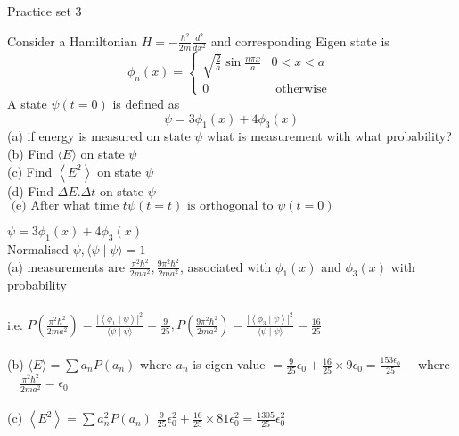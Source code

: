 \newpage
\begin{abox}
	Practice set 3
	\end{abox}
\begin{enumerate}
	\begin{minipage}{\textwidth}
	\item Consider a Hamiltonian $H=-\frac{\hbar^{2}}{2 m} \frac{d^{2}}{d x^{2}}$ and corresponding Eigen state is
	$$
	\phi_{n}(x)=\left\{\begin{array}{cc}
	\sqrt{\frac{2}{a}} \sin \frac{n \pi x}{a} & 0<x<a \\
	0 & \text { otherwise }
	\end{array}\right.
	$$
	A state $\psi(t=0)$ is defined as
	$$
	\psi=3 \phi_{1}(x)+4 \phi_{3}(x)
	$$
	(a) if energy is measured on state $\psi$ what is measurement with what probability?\\
	(b) Find $\langle E\rangle$ on state $\psi$\\
	(c) Find $\left\langle E^{2}\right\rangle$ on state $\psi$\\
	(d) Find $\Delta E . \Delta t$ on state $\psi$\\
	$\text { (e) After what time } t \psi(t=t) \text { is orthogonal to } \psi(t=0)$
\end{minipage}
\begin{answer}
	$ \psi=3 \phi_{1}(x)+4 \phi_{3}(x)$\\
	Normalised $\psi,\langle\psi \mid \psi\rangle=1$\\
	(a) measurements are $\frac{\pi^{2} \hbar^{2}}{2 m a^{2}}, \frac{9 \pi^{2} \hbar^{2}}{2 m a^{2}}$, associated with $\phi_{1}(x)$ and $\phi_{3}(x)$ with probability\\\\
	i.e. $P\left(\frac{\pi^{2} \hbar^{2}}{2 m a^{2}}\right)=\frac{\left|\left\langle\phi_{1} \mid \psi\right\rangle\right|^{2}}{\langle\psi \mid \psi\rangle}=\frac{9}{25}, P\left(\frac{9 \pi^{2} \hbar^{2}}{2 m a^{2}}\right)=\frac{\left|\left\langle\phi_{3} \mid \psi\right\rangle\right|^{2}}{\langle\psi \mid \psi\rangle}=\frac{16}{25}$\\\\
	(b) $\langle E\rangle=\sum a_{n} P\left(a_{n}\right)$ where $a_{n}$ is eigen value
	$=\frac{9}{25} \epsilon_{0}+\frac{16}{25} \times 9 \epsilon_{0}=\frac{153 \epsilon_{0}}{25} \quad$ where $\quad \frac{\pi^{2} \hbar^{2}}{2 m a^{2}}=\epsilon_{0}$\\\\
	(c) $\left\langle E^{2}\right\rangle=\sum a_{n}^{2} P\left(a_{n}\right)$
	$\frac{9}{25} \epsilon_{0}^{2}+\frac{16}{25} \times 81 \epsilon_{0}^{2}=\frac{1305}{25} \epsilon_{0}^{2}$ \\\\

\end{answer}
\end{enumerate}
